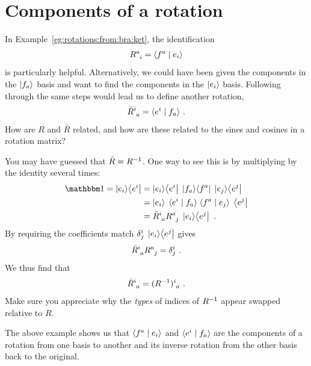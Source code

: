 \documentclass[12pt, oneside]{report}    %
\let\oldsection\section
\def\section{%
  \setcounter{sidenote}{1}%
  \oldsection
}
\begin{document}
\section{Components of a rotation}

In Example~\ref{eg:rotations:from:bra:ket}, the identification
\begin{align}
    R\aij{a}{i} = \la f^a \mid e_i \ra
    \label{eq:rotation:from:bra:ket}
\end{align}
is particularly helpful. Alternatively, we could have been given the components in the $\left|f_a\right\rangle$ basis and want to find the components in the $\left|e_i\right\rangle$ basis. Following through the same steps would lead us to define another rotation,
\begin{align}
    \bar R\aij{i}{a} = \la e^i \mid f_a \ra \ .
    \label{eq:rotation:from:bra:ket:inv}
\end{align}
How are $R$ and $\bar R$ related, and how are these related to the sines and cosines in a rotation matrix?
\begin{example}
You may have guessed that $\bar R = R^{-1}$. One way to see this is by multiplying by the identity several times:
\begin{align}
    \one = \ket{e_i}\!\bra{e^i}
    &= 
    \ket{e_i}\!\bra{e^i}\;
    \ket{f_a}\!\bra{f^a}\;
    \ket{e_j}\!\bra{e^j} 
    \\
    &= 
    \ket{e_i}\; \la e^i \mid f_a \ra \; \la f^a \mid e_j \ra \; \bra{e^j}
    \\
    &= \bar{R}\aij{i}{a} R\aij{a}{j} \; \ket{e_i}\!\bra{e^j} \ .
\end{align}
By requiring the coefficients match $\delta^i_j\; \left|e_i\right\rangle\!\left\langle e^j\right|$ gives
\begin{align}
    \bar{R}\aij{i}{a} R\aij{a}{j} = \delta^i_j \ .
\end{align}
We thus find that
\begin{align}
    \bar{R}\aij{i}{a} = (R\inv)\aij{i}{a} \ .
\end{align}
Make sure you appreciate why the \emph{types} of indices of $R^{-1}$ appear swapped relative to $R$.
\end{example}
The above example shows us that $\langle f^a \mid e_i \rangle$ and $\langle e^i \mid f_a \rangle $ are the components of a rotation from one basis to another and its inverse rotation from the other basis back to the original. 
\end{document}
